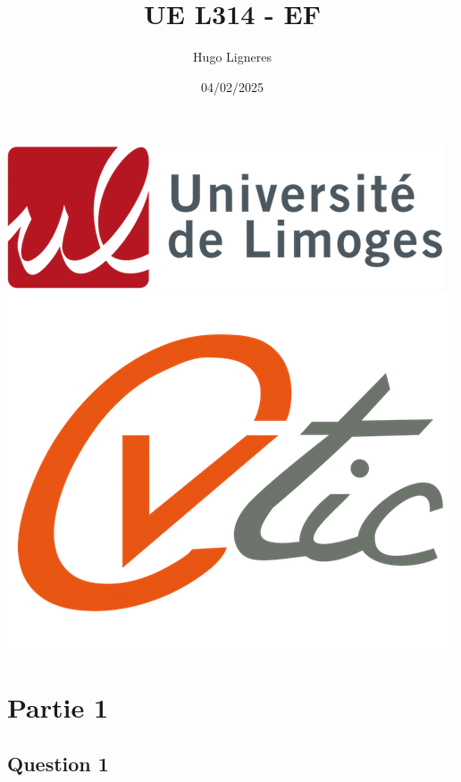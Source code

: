 \documentclass[12pt,a4paper]{article}
\title{UE L314 - EF}
\author{Hugo Ligneres}
\date{04/02/2025}
\begin{document}
\maketitle

\hrulefill
\vspace{6cm}
\begin{center}
	\includegraphics[scale=.4]{../images/univ.png}
		\\
		\vspace{2cm}
	\includegraphics[scale=.25]{../images/cvtic.png}
\end{center}


\newpage

\section*{Partie 1}

	\subsection*{Question 1}
\end{document}
